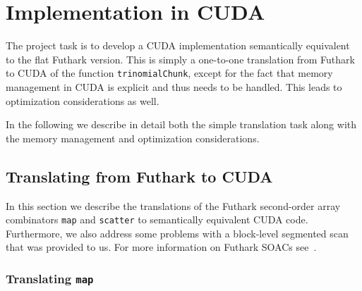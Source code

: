 \section{Implementation in CUDA}

The project task is to develop a CUDA implementation
semantically equivalent to the flat Futhark version. This is
simply a one-to-one translation from Futhark to CUDA of the
function \texttt{trinomialChunk}, except for the fact that
memory management in CUDA is explicit and thus needs to be
handled. This leads to optimization considerations as well.

In the following we describe in detail both the simple
translation task along with the memory management and
optimization considerations.


\subsection{Translating from Futhark to CUDA}

In this section we describe the translations of the Futhark
second-order array combinators \texttt{map} and
\texttt{scatter} to semantically equivalent CUDA
code. Furthermore, we also address some problems with a
block-level segmented scan that was provided to us. For more
information on Futhark SOACs see~\cite{futharkdoc}.

\subsubsection{Translating \texttt{map}}

